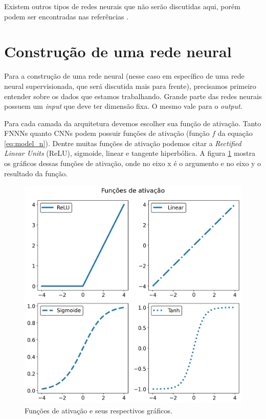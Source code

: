 \documentclass[a4paper,12pt,oneside]{book}
\begin{document}
\par Existem outros tipos de redes neurais que não serão discutidas aqui, porém podem ser encontradas nas referências \cite{rbfbook, RNN_fund}.

\section{Construção de uma rede neural}
\par Para a construção de uma rede neural (nesse caso em específico de uma rede neural supervisionada, que será discutida mais para frente), precisamos primeiro entender sobre os dados que estamos trabalhando. Grande parte das redes neurais possuem um \textit{input} que deve ter dimensão fixa. O mesmo vale para o \textit{output}.

\par Para cada camada da arquitetura devemos escolher sua função de ativação. Tanto FNNNs quanto CNNs podem possuir funções de ativação (função $f$ da equação \ref{eq:model_n}). Dentre muitas funções de ativação podemos citar a \textit{Rectified Linear Units} (ReLU)\cite{RELU}, sigmoide\cite{sigmoid_act}, linear e tangente hiperbólica\cite{act_comp}. A figura \ref{fig:ativacoes} mostra os gráficos dessas funções de ativação, onde no eixo x é o argumento e no eixo y o resultado da função.

\begin{figure}[H]
    \centering
    \includegraphics[scale = 0.7]{figs/ativacoes.png}
    \caption{Funções de ativação e seus respectivos gráficos.}
    \label{fig:ativacoes}
\end{figure}
\end{document}
